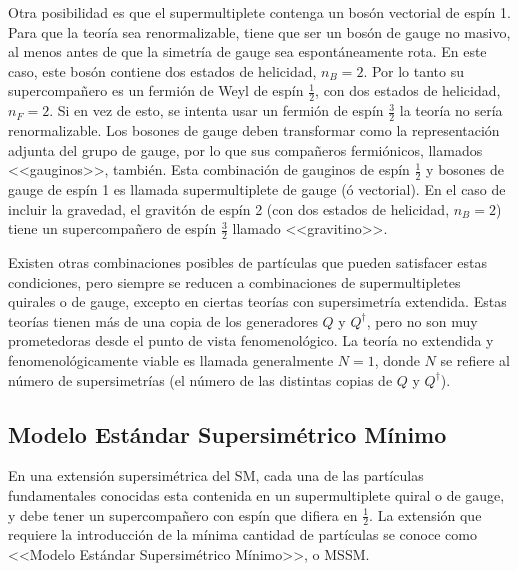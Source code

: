 Otra posibilidad es que el supermultiplete contenga un bosón vectorial de espín
1. Para que la teoría sea renormalizable, tiene que ser un bosón de gauge no
masivo, al menos antes de que la simetría de gauge sea espontáneamente rota. En
este caso, este bosón contiene dos estados de helicidad, $n_B=2$. Por lo tanto
su supercompa\~nero es un fermión de Weyl de espín $\frac{1}{2}$, con dos estados de
helicidad, $n_F=2$. Si en vez de esto, se intenta usar un fermión de espín $\frac{3}{2}$
la teoría no sería renormalizable. Los bosones de gauge deben transformar como
la representación adjunta del grupo de gauge, por lo que sus compañeros
fermiónicos, llamados <<gauginos>>, también. Esta combinación de gauginos
de espín $\frac{1}{2}$ y bosones de gauge de espín 1 es llamada supermultiplete de
gauge (ó vectorial).
En el caso de incluir la gravedad, el gravitón de espín 2 (con dos estados de helicidad,
$n_B=2$) tiene un supercompañero de espín $\frac{3}{2}$ llamado <<gravitino>>.

Existen otras combinaciones posibles de partículas que pueden satisfacer estas
condiciones, pero siempre se reducen a combinaciones de supermultipletes
quirales o de gauge, excepto en ciertas teorías con supersimetría extendida.
Estas teorías tienen más de una copia de los generadores $Q$ y $Q^\dagger$, pero no
son muy prometedoras desde el punto de vista fenomenológico. La teoría no
extendida y fenomenológicamente viable es llamada generalmente $N=1$, donde $N$
se refiere al número de supersimetrías (el número de las distintas copias de
$Q$ y $Q^\dagger$).


\subsection{Modelo Estándar Supersimétrico Mínimo}

En una extensión supersimétrica del SM, cada una de las partículas fundamentales
conocidas esta contenida en un supermultiplete quiral o de gauge, y debe tener
un supercompa\~nero con espín que difiera en $\frac{1}{2}$. La extensión que
requiere la introducción de la mínima cantidad de partículas se conoce como
<<Modelo Estándar Supersimétrico Mínimo>>, o MSSM.

